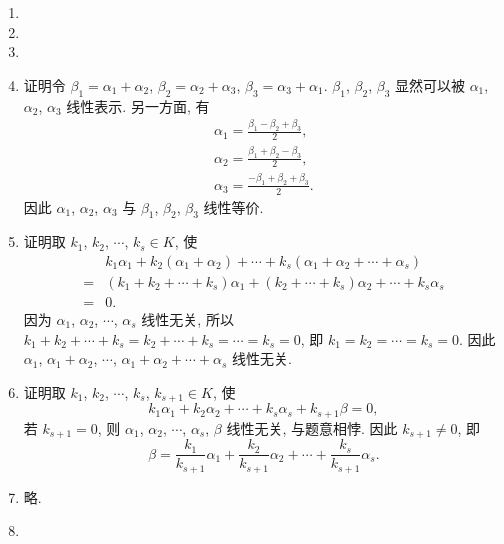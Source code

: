 \documentclass[a4paper, 11pt]{ctexart}
\begin{document}
    \begin{enumerate}
        \item %
        \item %
        \item %
        \item %
            {\heiti 证明}\quad 令 $\beta_1 = \alpha_1 + \alpha_2$, $\beta_2 = \alpha_2 + \alpha_3$, $\beta_3 = \alpha_3 + \alpha_1$. $\beta_1$, $\beta_2$, $\beta_3$ 显然可以被 $\alpha_1$, $\alpha_2$, $\alpha_3$ 线性表示.
            另一方面, 有
            \begin{gather*}
                \alpha_1 = \frac{\beta_1 - \beta_2 + \beta_3}{2}, \\
                \alpha_2 = \frac{\beta_1 + \beta_2 - \beta_3}{2}, \\
                \alpha_3 = \frac{-\beta_1 + \beta_2 + \beta_3}{2}.
            \end{gather*}
            因此 $\alpha_1$, $\alpha_2$, $\alpha_3$ 与 $\beta_1$, $\beta_2$, $\beta_3$ 线性等价.
        \item %
            {\heiti 证明}\quad 取 $k_1$, $k_2$, $\cdots$, $k_s \in K$, 使
            \begin{align*}
                    & k_1\alpha_1 + k_2(\alpha_1 + \alpha_2) + \cdots + k_s(\alpha_1 + \alpha_2 + \cdots + \alpha_s) \\
                ={} & (k_1 + k_2 + \cdots + k_s)\alpha_1 + (k_2 + \cdots + k_s)\alpha_2 + \cdots + k_s\alpha_s \\
                ={} & 0.    
            \end{align*}
            因为 $\alpha_1$, $\alpha_2$, $\cdots$, $\alpha_s$ 线性无关, 所以 $k_1 + k_2 + \cdots + k_s = k_2 + \cdots + k_s = \cdots = k_s = 0$,
            即 $k_1 = k_2 = \cdots = k_s = 0$. 因此 $\alpha_1$, $\alpha_1 + \alpha_2$, $\cdots$, $\alpha_1 + \alpha_2 + \cdots + \alpha_s$ 线性无关.
        \item %
            {\heiti 证明}\quad 取 $k_1$, $k_2$, $\cdots$, $k_s$, $k_{s+1} \in K$, 使
            \[
                k_1\alpha_1 + k_2\alpha_2 + \cdots + k_s\alpha_s + k_{s+1}\beta = 0,    
            \]
            若 $k_{s+1} = 0$, 则 $\alpha_1$, $\alpha_2$, $\cdots$, $\alpha_s$, $\beta$ 线性无关, 与题意相悖. 因此 $k_{s+1} \neq 0$, 即
            \[
                \beta = \frac{k_1}{k_{s+1}}\alpha_1 + \frac{k_2}{k_{s+1}}\alpha_2 + \cdots + \frac{k_s}{k_{s+1}}\alpha_s.    
            \]
        \item %
            略.
        \item %

\end{enumerate}
\end{document}
